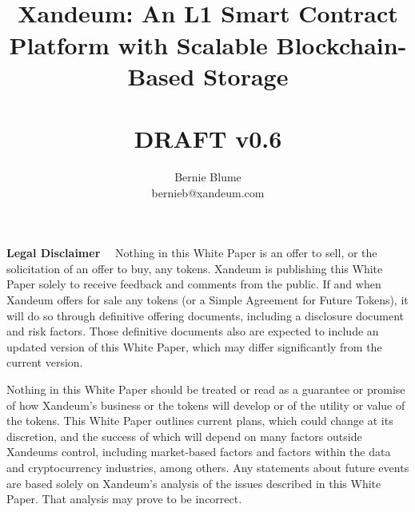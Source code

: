 \documentclass[11 pt]{article}   	%
\title{%
\ \\
Xandeum: An L1 Smart Contract Platform with Scalable Blockchain-Based Storage \\
\ \\
\large DRAFT v0.6}
\author{
{\rm Bernie Blume}\\
bernieb@xandeum.com
}
\let\oldsection\section
\renewcommand{\section}{\clearpage\oldsection}
\begin{document}
\maketitle

\maketitle

\textbf{\footnotesize Legal Disclaimer}\scriptsize
~~Nothing in this White Paper is an offer to sell, or the solicitation of an offer to buy, any tokens. Xandeum is publishing this White Paper solely to receive feedback and comments from the public. If and when Xandeum offers for sale any tokens (or a Simple Agreement for Future Tokens), it will do so through definitive offering documents, including a disclosure document and risk factors. Those definitive documents also are expected to include an updated version of this White Paper, which may differ significantly from the current version.

Nothing in this White Paper should be treated or read as a guarantee or promise of how Xandeum's business or the tokens will develop or of the utility or value of the tokens. This White Paper outlines current plans, which could change at its discretion, and the success of which will depend on many factors outside Xandeums control, including market-based factors and factors within the data and cryptocurrency industries, among others. Any statements about future events are based solely on Xandeum's analysis of the issues described in this White Paper. That analysis may prove to be incorrect.
\end{document}
